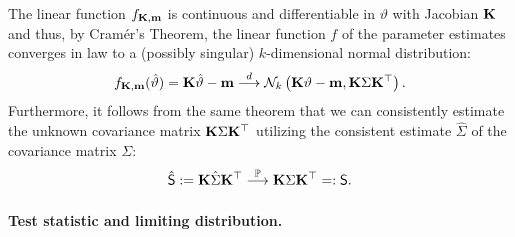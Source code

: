 \documentclass[12pt]{article}
\begin{document}
The linear function $f_{\mathbf{K}, \mathbf{m}}$ is continuous and differentiable in
$\vartheta$ with Jacobian $\mathbf{K}$ and thus, by Cram{\'e}r's Theorem, 
the linear function $f$ of the parameter estimates
converges in law to a (possibly singular) $k$-dimensional normal distribution:
\begin{eqnarray} \label{dist_f}
f_{\mathbf{K}, \mathbf{m}}(\hat{\vartheta}) = \mathbf{K} \hat{\vartheta} - \mathbf{m} 
\stackrel{d}{\longrightarrow} \mathcal{N}_k\left(\mathbf{K} \vartheta - \mathbf{m}, \mathbf{K} \Sigma \mathbf{K}^\top\right).
\end{eqnarray}
Furthermore, it follows from the same theorem that we can 
consistently estimate the unknown covariance matrix $\mathbf{K} \Sigma \mathbf{K}^\top$ utilizing
the consistent estimate $\hat{\Sigma}$ of the covariance matrix $\Sigma$:
\begin{eqnarray*}
\hat{\textsf{S}} := \mathbf{K} \hat{\Sigma} \mathbf{K}^\top \stackrel{\mathbb{P}}{\longrightarrow} \mathbf{K} \Sigma \mathbf{K}^\top =: \textsf{S}.
\end{eqnarray*}

\paragraph{Test statistic and limiting distribution.}
\end{document}
